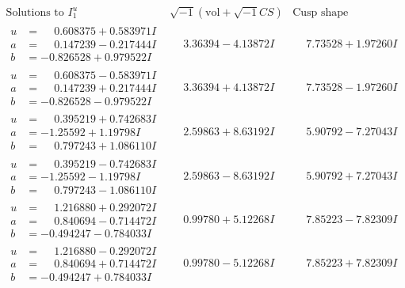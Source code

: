 \documentclass[1p]{elsarticle_modified}
\theoremstyle{definition}
\newcommand{\I}{\sqrt{-1}}
\begin{document}
$$\begin{array}{c|c|c}  
\text{Solutions to }I^u_{1}& \I (\text{vol} + \sqrt{-1}CS) & \text{Cusp shape}\\
 \hline 
\begin{aligned}
u &= \phantom{-}0.608375 + 0.583971 I \\
a &= \phantom{-}0.147239 - 0.217444 I \\
b &= -0.826528 + 0.979522 I\end{aligned}
 & \phantom{-}3.36394 - 4.13872 I & \phantom{-}7.73528 + 1.97260 I \\ \hline\begin{aligned}
u &= \phantom{-}0.608375 - 0.583971 I \\
a &= \phantom{-}0.147239 + 0.217444 I \\
b &= -0.826528 - 0.979522 I\end{aligned}
 & \phantom{-}3.36394 + 4.13872 I & \phantom{-}7.73528 - 1.97260 I \\ \hline\begin{aligned}
u &= \phantom{-}0.395219 + 0.742683 I \\
a &= -1.25592 + 1.19798 I \\
b &= \phantom{-}0.797243 + 1.086110 I\end{aligned}
 & \phantom{-}2.59863 + 8.63192 I & \phantom{-}5.90792 - 7.27043 I \\ \hline\begin{aligned}
u &= \phantom{-}0.395219 - 0.742683 I \\
a &= -1.25592 - 1.19798 I \\
b &= \phantom{-}0.797243 - 1.086110 I\end{aligned}
 & \phantom{-}2.59863 - 8.63192 I & \phantom{-}5.90792 + 7.27043 I \\ \hline\begin{aligned}
u &= \phantom{-}1.216880 + 0.292072 I \\
a &= \phantom{-}0.840694 - 0.714472 I \\
b &= -0.494247 - 0.784033 I\end{aligned}
 & \phantom{-}0.99780 + 5.12268 I & \phantom{-}7.85223 - 7.82309 I \\ \hline\begin{aligned}
u &= \phantom{-}1.216880 - 0.292072 I \\
a &= \phantom{-}0.840694 + 0.714472 I \\
b &= -0.494247 + 0.784033 I\end{aligned}
 & \phantom{-}0.99780 - 5.12268 I & \phantom{-}7.85223 + 7.82309 I \\ \hline\begin{aligned}

\end{aligned}
\end{array}$$
\end{document}
